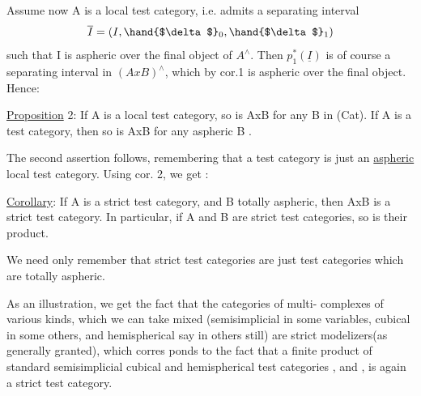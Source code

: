 
Assume now A is a local test category, i.e. admits a separating
interval
\[ \overline{I} = (I,\hand{$\delta$}_0,\hand{$\delta$}_1) \]
such that I is aspheric over the final object of $A^\wedge$. Then $p_1^*(\underline{I})$ is of
course a separating interval in $(AxB)^\wedge$, which by cor.1 is aspheric over
the final object. Hence:

\uline{Proposition} 2: If A is a local test category, so is AxB for any B in
(Cat). If A is a test category, then so is AxB for any aspheric B .

The second assertion follows, remembering that a test category is
just an \uline{aspheric} local test category. Using cor. 2, we get :

\uline{Corollary}: If A is a strict test category, and B totally aspheric,
then AxB is a strict test category. In particular, if A and B are
strict test categories, so is their product.

We need only remember that strict test categories are just test
categories which are totally aspheric.

As an illustration, we get the fact that the categories of multi-%
complexes of various kinds, which we can  take mixed (semisimplicial
in some variables, cubical in some others, and hemispherical say in
others still) are strict modelizers(as generally granted), which corres
\hand{-}ponds to the fact that a  finite product of  standard semisimplicial
cubical and hemispherical test categories \hand{$\Delta$} , \hand{$\Box$} and \hand{\unsure{$\bigcirc$}} , is again a
strict test category.

